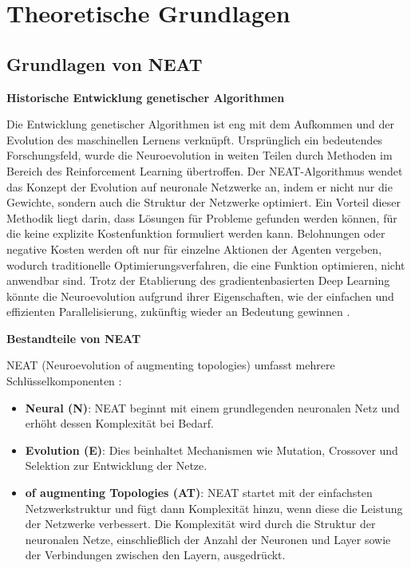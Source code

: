\chapter{Theoretische Grundlagen}
\label{chapter:2}

\section{Grundlagen von NEAT}

\textbf{Historische Entwicklung genetischer Algorithmen}

Die Entwicklung genetischer Algorithmen ist eng mit dem Aufkommen und der Evolution des maschinellen Lernens verknüpft. Ursprünglich ein bedeutendes Forschungsfeld, wurde die Neuroevolution in weiten Teilen durch Methoden im Bereich des Reinforcement Learning übertroffen. Der NEAT-Algorithmus wendet das Konzept der Evolution auf neuronale Netzwerke an, indem er nicht nur die Gewichte, sondern auch die Struktur der Netzwerke optimiert. Ein Vorteil dieser Methodik liegt darin, dass Lösungen für Probleme gefunden werden können, für die keine explizite Kostenfunktion formuliert werden kann. Belohnungen oder negative Kosten werden oft nur für einzelne Aktionen der Agenten vergeben, wodurch traditionelle Optimierungsverfahren, die eine Funktion optimieren, nicht anwendbar sind. Trotz der Etablierung des gradientenbasierten Deep Learning könnte die Neuroevolution aufgrund ihrer Eigenschaften, wie der einfachen und effizienten Parallelisierung, zukünftig wieder an Bedeutung gewinnen \cite{Such2017DeepNG}.

\textbf{Bestandteile von NEAT}

NEAT (Neuroevolution of augmenting topologies) umfasst mehrere Schlüsselkomponenten \cite{NEAT}:

\begin{itemize}
	\item \textbf{Neural (N)}: NEAT beginnt mit einem grundlegenden neuronalen Netz und erhöht dessen Komplexität bei Bedarf.
	\item \textbf{Evolution (E)}: Dies beinhaltet Mechanismen wie Mutation, Crossover und Selektion zur Entwicklung der Netze.
	\item \textbf{of augmenting Topologies (AT)}: NEAT startet mit der einfachsten Netzwerkstruktur und fügt dann Komplexität hinzu, wenn diese die Leistung der Netzwerke verbessert. Die Komplexität wird durch die Struktur der neuronalen Netze, einschließlich der Anzahl der Neuronen und Layer sowie der Verbindungen zwischen den Layern, ausgedrückt.
\end{itemize}

